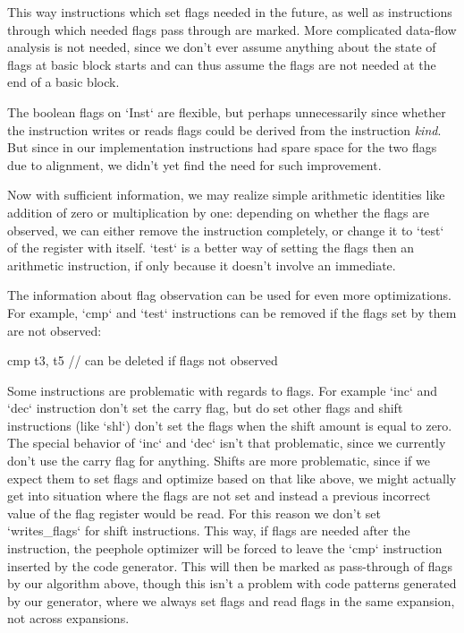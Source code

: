 This way instructions which set flags needed in the future, as well as
instructions through which needed flags pass through are marked. More
complicated data-flow analysis is not needed, since we don't ever assume
anything about the state of flags at basic block starts and can thus assume the
flags are not needed at the end of a basic block.

The boolean flags on `Inst` are flexible, but perhaps unnecessarily since whether the
instruction writes or reads flags could be derived from the instruction {\em
kind}. But since in our implementation instructions had spare space
for the two flags due to alignment, we didn't yet find the need for such
improvement.

Now with sufficient information, we may realize simple arithmetic identities
like addition of zero or multiplication by one: depending on whether the flags
are observed, we can either remove the instruction completely, or change it to
`test` of the register with itself. `test` is a better way of setting the flags
then an arithmetic instruction, if only because it doesn't involve an immediate.

The information about flag observation can be used for even more optimizations.
For example, `cmp` and `test` instructions can be removed if the flags set by
them are not observed:

\begtt
cmp t3, t5 // can be deleted if flags not observed
\endtt

Some instructions are problematic with regards to flags. For example `inc` and
`dec` instruction don't set the carry flag, but do set other flags and shift
instructions (like `shl`) don't set the flags when the shift amount is equal to
zero. The special behavior of `inc` and `dec` isn't that problematic, since we
currently don't use the carry flag for anything. Shifts are more problematic,
since if we expect them to set flags and optimize based on that like above, we
might actually get into situation where the flags are not set and instead a
previous incorrect value of the flag register would be read. For this reason we
don't set `writes_flags` for shift instructions. This way, if flags are needed
after the instruction, the peephole optimizer will be forced to leave the `cmp`
instruction inserted by the code generator. This will then be marked as
pass-through of flags by our algorithm above, though this isn't a problem with
code patterns generated by our generator, where we always set flags and read
flags in the same expansion, not across expansions.

